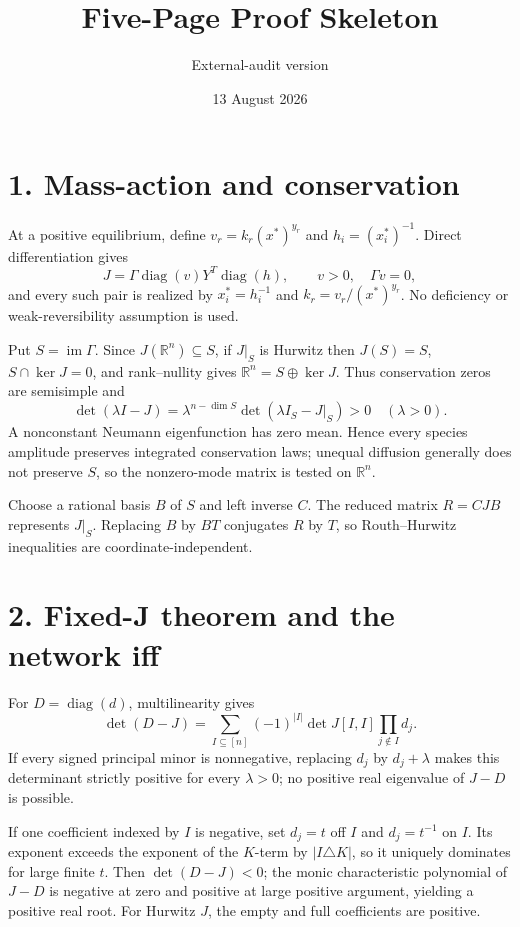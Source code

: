 \documentclass[10pt]{article}
\title{Five-Page Proof Skeleton}
\author{External-audit version}
\date{13 August 2026}
\newcommand{\diag}{\operatorname{diag}}
\newcommand{\im}{\operatorname{im}}
\newcommand{\R}{\mathbb R}
\begin{document}
\maketitle
\vspace{-1.3em}
\section*{1. Mass-action and conservation}
At a positive equilibrium, define $v_r=k_r(x^*)^{y_r}$ and
$h_i=(x_i^*)^{-1}$.  Direct differentiation gives
\[
 J=\Gamma\diag(v)Y^T\diag(h),\qquad v>0,\quad\Gamma v=0,
\]
and every such pair is realized by $x_i^*=h_i^{-1}$ and
$k_r=v_r/(x^*)^{y_r}$.  No deficiency or weak-reversibility assumption is
used.

Put $S=\im\Gamma$.  Since $J(\R^n)\subseteq S$, if $J|_S$ is Hurwitz then
$J(S)=S$, $S\cap\ker J=0$, and rank--nullity gives
$\R^n=S\oplus\ker J$.  Thus conservation zeros are semisimple and
\[
 \det(\lambda I-J)=\lambda^{n-\dim S}
 \det(\lambda I_S-J|_S)>0\quad(\lambda>0).
\]
A nonconstant Neumann eigenfunction has zero mean.  Hence every species
amplitude preserves integrated conservation laws; unequal diffusion generally
does not preserve $S$, so the nonzero-mode matrix is tested on $\R^n$.

Choose a rational basis $B$ of $S$ and left inverse $C$.  The reduced matrix
$R=CJB$ represents $J|_S$.  Replacing $B$ by $BT$ conjugates $R$ by $T$, so
Routh--Hurwitz inequalities are coordinate-independent.

\newpage
\section*{2. Fixed-J theorem and the network iff}
For $D=\diag(d)$, multilinearity gives
\[
 \det(D-J)=\sum_{I\subseteq[n]}(-1)^{|I|}\det J[I,I]
 \prod_{j\notin I}d_j.
\]
If every signed principal minor is nonnegative, replacing $d_j$ by
$d_j+\lambda$ makes this determinant strictly positive for every $\lambda>0$;
no positive real eigenvalue of $J-D$ is possible.

If one coefficient indexed by $I$ is negative, set $d_j=t$ off $I$ and
$d_j=t^{-1}$ on $I$.  Its exponent exceeds the exponent of the $K$-term by
$|I\triangle K|$, so it uniquely dominates for large finite $t$.  Then
$\det(D-J)<0$; the monic characteristic polynomial of $J-D$ is negative at
zero and positive at large positive argument, yielding a positive real root.
For Hurwitz $J$, the empty and full coefficients are positive.
\end{document}
